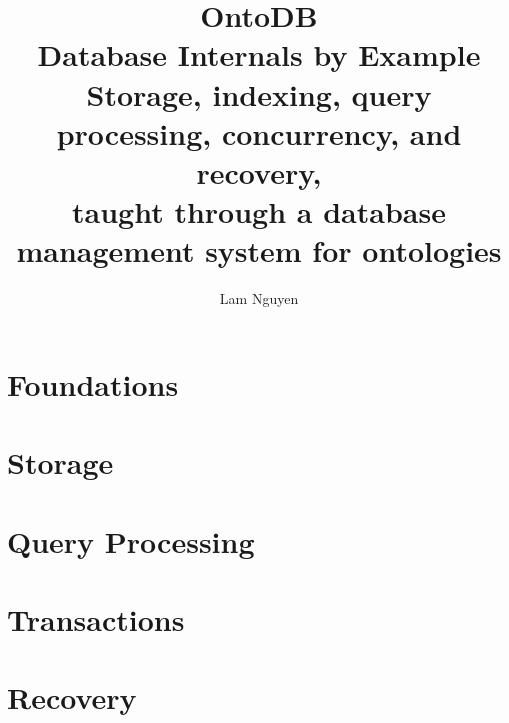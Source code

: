 \documentclass[11pt,twoside,openany]{book}
\title{\color{accent}\Huge\bfseries OntoDB\\[0.4em]
  \LARGE Database Internals by Example\\[1.2em]
  \large\mdseries Storage, indexing, query processing, concurrency, and recovery,\\
  taught through a database management system for ontologies}
\author{Lam Nguyen}
\date{}
\begin{document}
\frontmatter
\maketitle
\tableofcontents
\listofdecisions


\mainmatter
\part{Foundations}


\part{Storage}






\part{Query Processing}






\part{Transactions}



\part{Recovery}\label{part:recovery-ref}






\appendix



\backmatter

\end{document}
